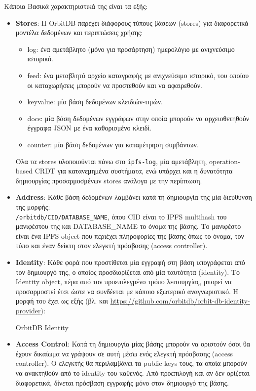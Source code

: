 Κάποια Βασικά χαρακτηριστικά της είναι τα εξής:
\begin{itemize}
	\item \textbf{Stores}: Η OrbitDB παρέχει διάφορους τύπους βάσεων (stores) για διαφορετικά μοντέλα δεδομένων και περιπτώσεις χρήσης:
	
	\begin{itemize}
		\item log: ένα αμετάβλητο (μόνο για προσάρτηση) ημερολόγιο με ανιχνεύσιμο ιστορικό.
		\item feed: ένα μεταβλητό αρχείο καταγραφής με ανιχνεύσιμο ιστορικό, του οποίου οι καταχωρήσεις μπορούν να προστεθούν και να αφαιρεθούν.
		\item keyvalue: μία βάση δεδομένων κλειδιών-τιμών.
		\item docs: μία βάση δεδομένων εγγράφων στην οποία μπορούν να αρχειοθετηθούν έγγραφα JSON με ένα καθορισμένο κλειδί.
		\item counter: μία βάση δεδομένων για καταμέτρηση συμβάντων.
	\end{itemize}
	
	Όλα τα stores υλοποιούνται πάνω στο \texttt{ipfs-log}, μία αμετάβλητη, operation-based CRDT για κατανεμημένα συστήματα, ενώ υπάρχει και η δυνατότητα δημιουργίας προσαρμοσμένων stores ανάλογα με την περίπτωση.
	
	\item \textbf{Address}: Κάθε βάση δεδομένων λαμβάνει κατά τη δημιουργία της μία διεύθυνση της μορφής: \texttt{\\/orbitdb/CID/DATABASE\_NAME}, όπου CID είναι το IPFS multihash του μανιφέστου της και DATABASE\_NAME το όνομα της βάσης\cite{2.8-orbitdb-guide}. Το μανιφέστο είναι ένα IPFS object που περιέχει πληροφορίες της βάσης όπως το όνομα, τον τύπο και έναν δείκτη στον ελεγκτή πρόσβασης (access controller).
	
	\item \textbf{Identity}: Κάθε φορά που προστίθεται μία εγγραφή στη βάση υπογράφεται από τον δημιουργό της, ο οποίος προσδιορίζεται από μία ταυτότητα (identity). Το Identity object, πέρα από τον προεπιλεγμένο τρόπο λειτουργίας, μπορεί να προσαρμοστεί έτσι ώστε να συνδέεται με κάποιο εξωτερικό αναγνωριστικό.
	Η μορφή του έχει ως εξής (βλ. και  \url{https://github.com/orbitdb/orbit-db-identity-provider}):
	
	\begin{enumitemcenteredfigure}
		\caption{OrbitDB Identity}
	\end{enumitemcenteredfigure}

	\item \textbf{Access Control}: Κατά τη δημιουργία μίας βάσης μπορούν να οριστούν όσοι θα έχουν δικαίωμα να γράψουν σε αυτή μέσω ενός ελεγκτή πρόσβασης (access controller). Ο ελεγκτής θα περιλαμβάνει τα public keys τους, τα οποία μπορούν να ανακτηθούν από το identity του καθενός. Από προεπιλογή και αν δεν ορίζεται διαφορετικά, δίνεται πρόσβαση εγγραφής μόνο στον δημιουργό της βάσης.
\end{itemize}
